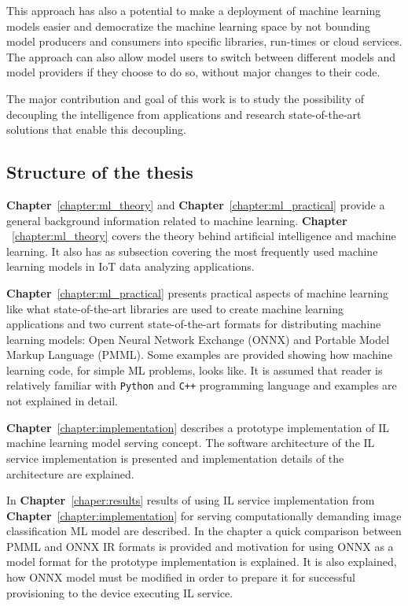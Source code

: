 \documentclass[english, 12pt, a4paper, elec, utf8, online]{aaltothesis}
\begin{document}
This approach has also a potential to make a deployment of machine learning models easier and democratize the machine learning space by not bounding model producers and consumers into specific libraries, run-times or cloud services. The approach can also allow model users to switch between different models and model providers if they choose to do so, without major changes to their code.

The major contribution and goal of this work is to study the possibility of decoupling the intelligence from applications and research state-of-the-art solutions that enable this decoupling.

\subsection{Structure of the thesis}
\textbf{Chapter}~\ref{chapter:ml_theory} and \textbf{Chapter}~\ref{chapter:ml_practical} provide a general background information related to machine learning. \textbf{Chapter} ~\ref{chapter:ml_theory} covers the theory behind artificial intelligence and machine learning. It also has as subsection covering the most frequently used machine learning models in IoT data analyzing applications.

 \textbf{Chapter}~\ref{chapter:ml_practical} presents practical aspects of machine learning like what state-of-the-art libraries are used to create machine learning applications and two current state-of-the-art formats for distributing machine learning models: Open Neural Network Exchange (ONNX) and Portable Model Markup Language (PMML). Some examples are provided showing how machine learning code, for simple ML problems, looks like. It is assumed that reader is relatively familiar with \texttt{Python} and \texttt{C++} programming language and examples are not explained in detail.  

\textbf{Chapter}~\ref{chapter:implementation} describes a prototype implementation of IL machine learning model serving concept. The software architecture of the IL service  implementation is presented and implementation details of the architecture are explained.

In \textbf{Chapter}~\ref{chaper:results} results of using IL service implementation from \textbf{Chapter}~\ref{chapter:implementation} for serving computationally demanding image classification ML model   
are described. In the chapter a quick comparison between PMML and ONNX IR formats is provided and motivation for using ONNX as a model format for the prototype implementation is explained. It is also explained, how ONNX model must be modified in order to prepare it for successful provisioning to the device executing IL service.           
\end{document}
